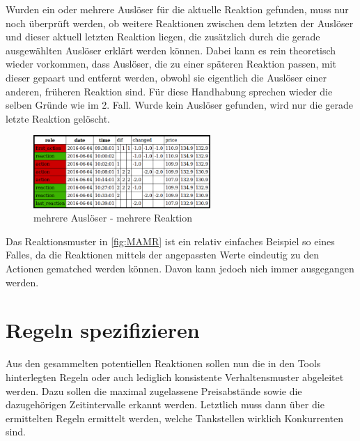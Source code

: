 \begin{enumerate}
Wurden ein oder mehrere Auslöser für die aktuelle Reaktion gefunden, muss nur noch überprüft werden, ob weitere Reaktionen zwischen dem letzten der Auslöser und dieser aktuell letzten Reaktion liegen, die zusätzlich durch die gerade ausgewählten Auslöser erklärt werden können. Dabei kann es rein theoretisch wieder vorkommen, dass Auslöser, die zu einer späteren Reaktion passen, mit dieser gepaart und entfernt werden, obwohl sie eigentlich die Auslöser einer anderen, früheren Reaktion sind. Für diese Handhabung sprechen wieder die selben Gründe wie im 2. Fall. Wurde kein Auslöser gefunden, wird nur die gerade letzte Reaktion gelöscht.\\
\begin{figure}[H]
	\center
	\includegraphics[width=0.6\textwidth]{Bilder/mamr3.jpg}
	\caption{mehrere Auslöser - mehrere Reaktion}
	\label{fig:MAMR}
\end{figure}
Das Reaktionsmuster in \autoref{fig:MAMR} ist ein relativ einfaches Beispiel so eines Falles, da die Reaktionen mittels der angepassten Werte eindeutig zu den Actionen gematched werden können. Davon kann jedoch nich immer ausgegangen werden.
\end{enumerate}

\section{Regeln spezifizieren}
Aus den gesammelten potentiellen Reaktionen sollen nun die in den Tools hinterlegten Regeln oder auch lediglich konsistente Verhaltensmuster abgeleitet werden. Dazu sollen die maximal zugelassene Preisabstände sowie die dazugehörigen Zeitintervalle erkannt werden. Letztlich muss dann über die ermittelten Regeln ermittelt werden, welche Tankstellen wirklich Konkurrenten sind. 

